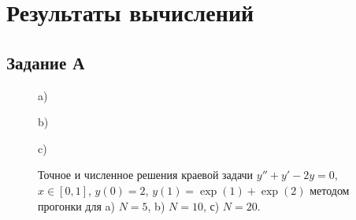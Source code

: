 \documentclass[
11pt,
master, %
subf, %
href, %
colorlinks=true, %
times, %
]{disser}
\begin{document}
\newpage
\section{Результаты вычислений}
\subsection{Задание А}
\begin{figure}[h]
\begin{minipage}[h]{1\linewidth}
 a) \\
\end{minipage}
\vfill
\begin{minipage}[h]{1\linewidth}
 b) \\
\end{minipage}
\vfill
\begin{minipage}[h]{1\linewidth}
 c) \\
\end{minipage}
\caption{Точное и численное решения краевой задачи $y'' + y' - 2y = 0$, $x \in [0,1]$, $y(0) = 2$, $y(1) = \exp(1) + \exp(2)$ методом прогонки для  a) $N = 5$, b) $N = 10$, с) $N = 20$.}
\label{ris:1}
\end{figure}
\end{document}

